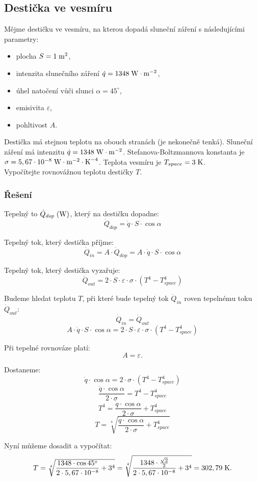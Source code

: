\documentclass{article}
\begin{document}
\subsection{Destička ve vesmíru}
Mějme destičku ve vesmíru, na kterou dopadá sluneční záření s následujícími parametry:
\begin{itemize}
    \item plocha $S = 1 \; \textrm{m}^{\textrm{2}}$,
    \item intenzita slunečního záření $\dot{q} = 1348 \; \textrm{W} \cdot \textrm{m}^{-2}$,
    \item úhel natočení vůči slunci $\alpha = 45^{\circ}$,
    \item emisivita $\varepsilon$,
    \item pohltivost $A$.
\end{itemize}

Destička má stejnou teplotu na obouch stranách (je nekonečně tenká). Sluneční záření má intenzitu $\dot{q} = 1348 \; \textrm{W} \cdot \textrm{m}^{-2}$. Stefanova-Boltzmannova konstanta je $\sigma = 5,67 \cdot 10^{-8} \; \textrm{W} \cdot \textrm{m}^{-2} \cdot \textrm{K}^{-4}$. Teplota vesmíru je $T_{space} = 3 \; \textrm{K}$.\\

Vypočítejte rovnovážnou teplotu destičky $T$.

\subsubsection{Řešení}
Tepelný to $\dot{Q}_{dop} \; (\textrm{W})$, který na destičku dopadne:
$$
    \dot{Q}_{dop} = \dot{q} \cdot S \cdot \cos \alpha
$$

Tepelný tok, který destička příjme:
$$
    \dot{Q}_{in} = A \cdot \dot{Q}_{dop} = A \cdot \dot{q} \cdot S \cdot \cos \alpha
$$

Tepelný tok, který destička vyzařuje:
$$
    \dot{Q}_{out} = 2 \cdot S \cdot \varepsilon \cdot \sigma \cdot \left( T^4 - T_{space}^4 \right)
$$

Budeme hledat teplotu $T$, při které bude tepelný tok $\dot{Q}_{in}$ roven tepelnému toku $\dot{Q}_{out}$:
$$
    \dot{Q}_{in} = \dot{Q}_{out}
$$
$$
    A \cdot \dot{q} \cdot S \cdot \cos \alpha = 2 \cdot S \cdot \varepsilon \cdot \sigma \cdot \left( T^4 - T_{space}^4 \right)
$$

Při tepelné rovnováze platí:
$$
    A = \varepsilon.
$$

Dostaneme:
$$
    \dot{q} \cdot \cos \alpha = 2 \cdot \sigma \cdot \left( T^4 - T_{space}^4 \right)
$$
$$
    \frac{\dot{q} \cdot \cos \alpha}{2 \cdot \sigma} = T^4 - T_{space}^4
$$
$$
    T^4 = \frac{\dot{q} \cdot \cos \alpha}{2 \cdot \sigma} + T_{space}^4
$$
$$
    T = \sqrt[4]{\frac{\dot{q} \cdot \cos \alpha}{2 \cdot \sigma} + T_{space}^4}
$$

Nyní můžeme dosadit a vypočítat:
$$
    T = \sqrt[4]{\frac{1348 \cdot \cos 45^{\circ}}{2 \cdot 5,67 \cdot 10^{-8}} + 3^4} = \sqrt[4]{\frac{1348 \cdot \frac{\sqrt{2}}{2}}{2 \cdot 5,67 \cdot 10^{-8}} + 3^4} = 302,79 \; \textrm{K}.
$$
\end{document}
